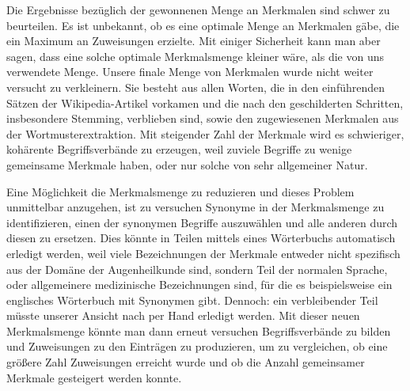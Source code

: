 \documentclass[pagesize,paper=A4,DIV=calc,fontsize=12pt,draft=false]{scrreprt}
\begin{document}
Die Ergebnisse bezüglich der gewonnenen Menge an Merkmalen sind schwer zu beurteilen.
Es ist unbekannt, ob es eine optimale Menge an Merkmalen gäbe, die ein Maximum an Zuweisungen erzielte.
Mit einiger Sicherheit kann man aber sagen, dass eine solche optimale Merkmalsmenge kleiner wäre, als die von uns verwendete Menge.
Unsere finale Menge von Merkmalen wurde nicht weiter versucht zu verkleinern.
Sie besteht aus allen Worten, die in den einführenden Sätzen der Wikipedia-Artikel vorkamen und die nach den geschilderten Schritten, insbesondere Stemming, verblieben sind, sowie den zugewiesenen Merkmalen aus der Wortmusterextraktion.
Mit steigender Zahl der Merkmale wird es schwieriger, kohärente Begriffsverbände zu erzeugen, weil zuviele Begriffe zu wenige gemeinsame Merkmale haben, oder nur solche von sehr allgemeiner Natur.

Eine Möglichkeit die Merkmalsmenge zu reduzieren und dieses Problem unmittelbar anzugehen, ist zu versuchen Synonyme in der Merkmalsmenge zu identifizieren, einen der synonymen Begriffe auszuwählen und alle anderen durch diesen zu ersetzen.
Dies könnte in Teilen mittels eines Wörterbuchs automatisch erledigt werden, weil viele Bezeichnungen der Merkmale entweder nicht spezifisch aus der Domäne der Augenheilkunde sind, sondern Teil der normalen Sprache, oder allgemeinere medizinische Bezeichnungen sind, für die es beispielsweise ein englisches Wörterbuch mit Synonymen gibt.
Dennoch: ein verbleibender Teil müsste unserer Ansicht nach per Hand erledigt werden.
Mit dieser neuen Merkmalsmenge könnte man dann erneut versuchen Begriffsverbände zu bilden und Zuweisungen zu den Einträgen zu produzieren, um zu vergleichen, ob eine größere Zahl Zuweisungen erreicht wurde und ob die Anzahl gemeinsamer Merkmale gesteigert werden konnte.
\end{document}
